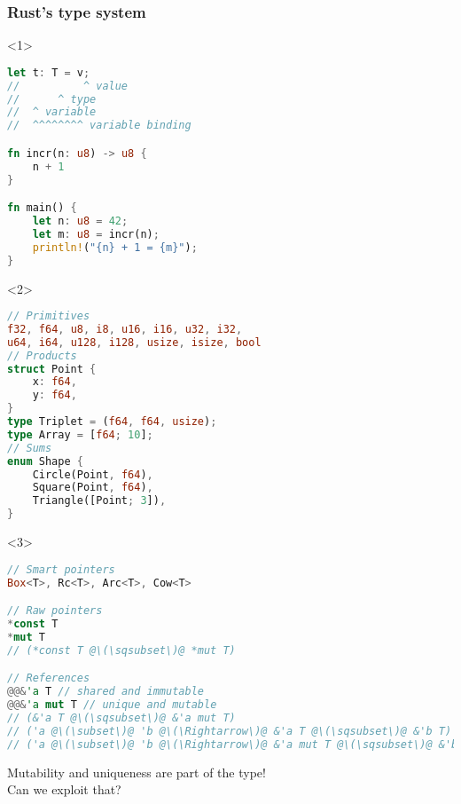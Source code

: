 \begin{frame}[fragile]
    \frametitle{Rust's type system}
    \begin{onlyenv}<1>
        \begin{lstlisting}[language=rust]
let t: T = v;
//          ^ value
//      ^ type
//  ^ variable
//  ^^^^^^^^ variable binding

fn incr(n: u8) -> u8 {
    n + 1
}

fn main() {
    let n: u8 = 42;
    let m: u8 = incr(n);
    println!("{n} + 1 = {m}");
}
        \end{lstlisting}
    \end{onlyenv}

    \begin{onlyenv}<2>
        \begin{lstlisting}[language=rust]
// Primitives
f32, f64, u8, i8, u16, i16, u32, i32,
u64, i64, u128, i128, usize, isize, bool
// Products
struct Point {
    x: f64,
    y: f64,
}
type Triplet = (f64, f64, usize);
type Array = [f64; 10];
// Sums
enum Shape {
    Circle(Point, f64),
    Square(Point, f64),
    Triangle([Point; 3]),
}
        \end{lstlisting}
    \end{onlyenv}

    \begin{onlyenv}<3>
        \begin{lstlisting}[language=rust, escapechar=@]
// Smart pointers
Box<T>, Rc<T>, Arc<T>, Cow<T>

// Raw pointers
*const T
*mut T
// (*const T @\(\sqsubset\)@ *mut T)

// References
@@&'a T // shared and immutable
@@&'a mut T // unique and mutable
// (&'a T @\(\sqsubset\)@ &'a mut T)
// ('a @\(\subset\)@ 'b @\(\Rightarrow\)@ &'a T @\(\sqsubset\)@ &'b T)
// ('a @\(\subset\)@ 'b @\(\Rightarrow\)@ &'a mut T @\(\sqsubset\)@ &'b mut T)
        \end{lstlisting}
    Mutability and uniqueness are part of the type!\\
    Can we exploit that?
    \end{onlyenv}

\end{frame}

